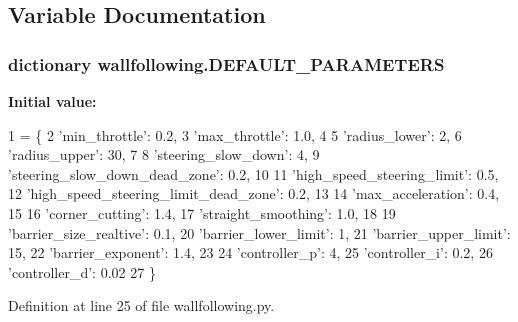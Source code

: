 \subsection{Variable Documentation}
\subsubsection[{\texorpdfstring{D\+E\+F\+A\+U\+L\+T\+\_\+\+P\+A\+R\+A\+M\+E\+T\+E\+RS}{DEFAULT_PARAMETERS}}]{\setlength{\rightskip}{0pt plus 5cm}dictionary wallfollowing.\+D\+E\+F\+A\+U\+L\+T\+\_\+\+P\+A\+R\+A\+M\+E\+T\+E\+RS}\hypertarget{namespacewallfollowing_ac161be1e11f04000d35ca725afa3ccdf}{}\label{namespacewallfollowing_ac161be1e11f04000d35ca725afa3ccdf}
{\bfseries Initial value\+:}
\begin{DoxyCode}
1 = \{
2     \textcolor{stringliteral}{'min\_throttle'}: 0.2,
3     \textcolor{stringliteral}{'max\_throttle'}: 1.0,
4 
5     \textcolor{stringliteral}{'radius\_lower'}: 2,
6     \textcolor{stringliteral}{'radius\_upper'}: 30,
7 
8     \textcolor{stringliteral}{'steering\_slow\_down'}: 4,
9     \textcolor{stringliteral}{'steering\_slow\_down\_dead\_zone'}: 0.2,
10 
11     \textcolor{stringliteral}{'high\_speed\_steering\_limit'}: 0.5,
12     \textcolor{stringliteral}{'high\_speed\_steering\_limit\_dead\_zone'}: 0.2,
13 
14     \textcolor{stringliteral}{'max\_acceleration'}: 0.4,
15 
16     \textcolor{stringliteral}{'corner\_cutting'}: 1.4,
17     \textcolor{stringliteral}{'straight\_smoothing'}: 1.0,
18 
19     \textcolor{stringliteral}{'barrier\_size\_realtive'}: 0.1,
20     \textcolor{stringliteral}{'barrier\_lower\_limit'}: 1,
21     \textcolor{stringliteral}{'barrier\_upper\_limit'}: 15,
22     \textcolor{stringliteral}{'barrier\_exponent'}: 1.4,
23 
24     \textcolor{stringliteral}{'controller\_p'}: 4,
25     \textcolor{stringliteral}{'controller\_i'}: 0.2,
26     \textcolor{stringliteral}{'controller\_d'}: 0.02
27 \}
\end{DoxyCode}


Definition at line 25 of file wallfollowing.\+py.


